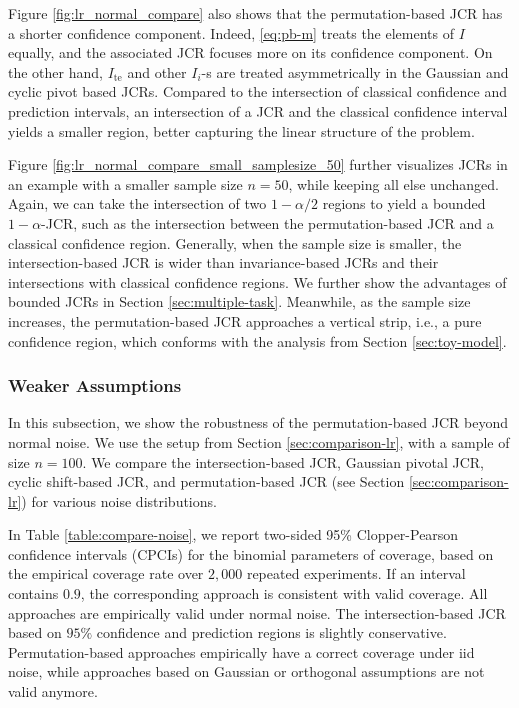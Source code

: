 \documentclass[english]{article}
\begin{document}
    Figure \ref{fig:lr_normal_compare}
    also shows that the permutation-based JCR has a shorter confidence component. 
    Indeed, \eqref{eq:pb-m} treats the elements of $I$ equally, and the associated JCR focuses more on its confidence component. 
    On the other hand, $I_\mathrm{te}$ and other $I_i$-s are treated asymmetrically in the Gaussian and cyclic pivot based JCRs. 
    Compared to the intersection of classical confidence and prediction intervals, an intersection of 
    a JCR and the classical confidence interval
    yields a smaller region, better capturing the linear structure of the problem.
    

Figure \ref{fig:lr_normal_compare_small_samplesize_50} further visualizes JCRs in an example with a smaller sample size $n=50$, while keeping all else unchanged. 
Again, we can take the intersection of two $1-\alpha/2$ regions to yield a bounded $1-\alpha$-JCR, 
such as the intersection between the permutation-based JCR and a classical confidence region. 
Generally, when the sample size is smaller, the intersection-based JCR is wider
than invariance-based JCRs and
their intersections with classical confidence regions. 
We further show the advantages of bounded JCRs in Section \ref{sec:multiple-task}.
Meanwhile, as the sample size increases, the permutation-based JCR approaches a vertical strip,
i.e., a pure confidence region, 
which conforms with the analysis from Section \ref{sec:toy-model}.


\subsubsection{Weaker Assumptions}

In this subsection, we show the robustness of the permutation-based JCR 
beyond normal noise. 
We use the setup from Section \ref{sec:comparison-lr}, with a sample of size $n=100$.
We compare the intersection-based JCR, Gaussian pivotal JCR, cyclic shift-based JCR, and permutation-based JCR (see Section \ref{sec:comparison-lr})
for various noise distributions. 

In Table \ref{table:compare-noise}, we report two-sided 95\% Clopper-Pearson confidence intervals  (CPCIs)
for the binomial parameters of coverage, 
based on the empirical coverage rate over $2,000$ repeated experiments. 
If an interval contains $0.9$, the corresponding approach is consistent with valid coverage. 
All approaches are empirically valid
under normal noise. 
The intersection-based JCR based on $95\%$ confidence and prediction regions is slightly conservative.
Permutation-based approaches empirically have a correct coverage under iid noise, 
while approaches based on Gaussian or orthogonal assumptions are not valid anymore.
\end{document}
